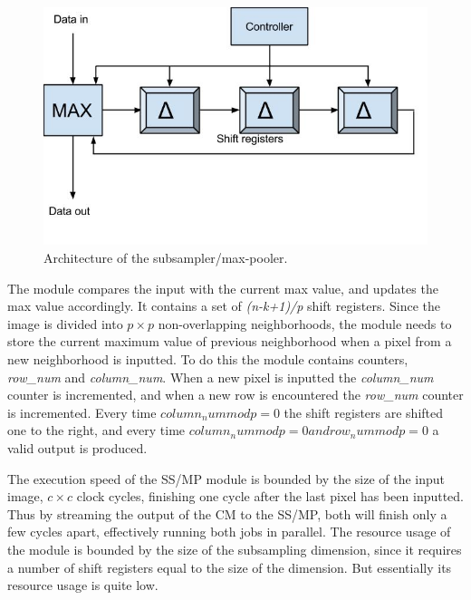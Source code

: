 \begin{figure}[h!]
  \centering
      \includegraphics[width=1.0\textwidth]{Figures/Method/submax}
  \caption{Architecture of the subsampler/max-pooler.}
\end{figure}

The module compares the input with the current max value, and updates the max value accordingly. It contains a set of \textit{(n-k+1)/p} shift registers. Since the image is divided into $ p \times p $ non-overlapping neighborhoods, the module needs to store the current maximum value of previous neighborhood when a pixel from a new neighborhood is inputted. To do this the module contains counters, \textit{row\_num} and \textit{column\_num}. When a new pixel is inputted the \textit{column\_num} counter is incremented, and when a new row is encountered the \textit{row\_num} counter is incremented. Every time $ column_num mod p = 0 $ the shift registers are shifted one to the right, and every time $ column_num mod p = 0 and row_num mod p = 0 $ a valid output is produced. 

The execution speed of the SS/MP module is bounded by the size of the input image, $ c \times c $ clock cycles, finishing one cycle after the last pixel has been inputted. 
Thus by streaming the output of the CM to the SS/MP, both will finish only a few cycles apart, effectively running both jobs in parallel. The resource usage of the module is bounded by the size of the subsampling dimension, since it requires a number of shift registers equal to the size of the dimension. But essentially its resource usage is quite low.  